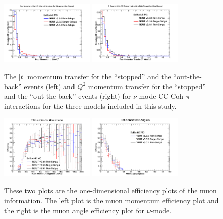 \documentclass[11pt]{article}
\begin{document}
\begin{figure}[H]
\centering
\includegraphics[width=0.4\textwidth]{CCCohPlots/NMCCCohGoodT.png}
\includegraphics[width=0.4\textwidth]{CCCohPlots/NMCCCohGoodQ2.png}
\caption{The $|t|$ momentum transfer for the ``stopped'' and the ``out-the-back'' events (left) and $Q^2$ momentum transfer for the ``stopped'' and the ``out-the-back'' events (right) for $\nu$-mode CC-Coh $\pi$ interactions for the three models included in this study.} 
\label{fig:NuModeCCCohGoodTAndQ2}
\end{figure}





\begin{figure}[H]
\centering
\includegraphics[width=0.4\textwidth]{NMCombinedPlotsImages/24-NMCombinedPlots.png}
\includegraphics[width=0.4\textwidth]{NMCombinedPlotsImages/25-NMCombinedPlots.png}
\caption{These two plots are the one-dimensional efficiency plots of the muon information. The left plot is the muon momentum efficiency plot and the right is the muon angle efficiency plot for $\nu$-mode.}
\label{fig:MomAngEffNM}
\end{figure}
\end{document}
